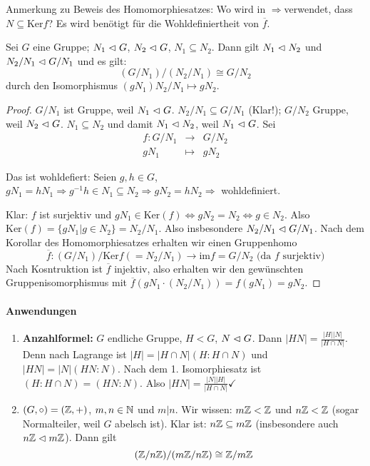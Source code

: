 \documentclass[12pt,a4paper]{scrartcl}
\begin{document}
Anmerkung zu Beweis des Homomorphiesatzes: Wo wird in \glqq$\Rightarrow$\grqq verwendet, dass $N\subseteq \mbox{Ker}f$? Es wird benötigt für die Wohldefiniertheit von $\overline{f}$.


\begin{satz}[2. Isomorphiesatz]
	Sei $G$ eine Gruppe; $N_1\vartriangleleft G$, $N_2\vartriangleleft G$, $N_1\subseteq N_2$. Dann gilt $N_1\vartriangleleft N_2$ und $N_2/N_1\vartriangleleft G/N_1$ und es gilt:
	$$(G/N_1)/(N_2/N_1) \cong G/N_2$$ durch den Isomorphismus $(gN_1)N_2/N_1\mapsto gN_2$.
\end{satz}	

\begin{proof}
	$G/N_1$ ist Gruppe, weil $N_1\vartriangleleft G$. $N_2/N_1\subseteq G/N_1$ (Klar!); $G/N_2$ Gruppe, weil $N_2\vartriangleleft G$. $N_1\subseteq N_2$ und damit $N_1\vartriangleleft N_2$, weil $N_1\vartriangleleft G$. Sei
	\begin{eqnarray*}
		f\colon G/N_1 & \to &G/N_2\\
		gN_1 & \mapsto & gN_2
	\end{eqnarray*}
	
	Das ist wohldefiert: Seien $g, h\in G$, $gN_1 = hN_1\Rightarrow g^{-1}h\in N_1\subseteq N_2\Rightarrow gN_2 = hN_2\Rightarrow$ wohldefiniert.
	
	Klar: $f$ ist surjektiv und $gN_1\in \mbox{Ker}(f)\Leftrightarrow gN_2 = N_2\Leftrightarrow g\in N_2$. Also $\mbox{Ker}(f) = \{gN_1|g\in N_2\} = N_2/N_1$. Also insbesondere $N_2/N_1\vartriangleleft G/N_1$.
	Nach dem Korollar des Homomorphiesatzes erhalten wir einen Gruppenhomo
	$$ \overline{f}\colon (G/N_1)/\mbox{Ker}f(=N_2/N_1)\to \mbox{im}f = G/N_2 \mbox{ (da $f$ surjektiv)}$$
	Nach Kosntruktion ist $\overline{f}$ injektiv, also erhalten wir den gewünschten Gruppenisomorphismus mit $\overline{f}(gN_1\cdot (N_2/N_1)) = f(gN_1) = gN_2$.
\end{proof}

\paragraph{Anwendungen}
\begin{enumerate}
	\item \textbf{Anzahlformel:} $G$ endliche Gruppe, $H<G$, $N\vartriangleleft G$. Dann $|HN| =\frac{ |H||N|}{|H\cap N|}$. Denn nach Lagrange ist $|H| = |H\cap N|(H:H\cap N)$ und $|HN| = |N|(HN:N)$. Nach dem 1. Isomorphiesatz ist $(H:H\cap N)=(HN:N)$. Also $|HN| = \frac{|N||H|}{|H\cap N|}$\hfill $\checkmark$
	\item $(G,\circ) = (\mathbb Z, +)$, $m,n\in\mathbb N$ und $m|n$. Wir wissen: $m\mathbb Z<\mathbb Z$ und $n\mathbb Z<\mathbb Z$ (sogar Normalteiler, weil $G$ abelsch ist). Klar ist: $n\mathbb Z\subseteq m\mathbb Z$ (insbesondere auch $n\mathbb Z\vartriangleleft m\mathbb Z$). Dann gilt 
	$$(\mathbb Z/n\mathbb Z)/(m\mathbb Z/n\mathbb Z) \cong \mathbb Z/m\mathbb Z$$
\end{enumerate}
\end{document}
